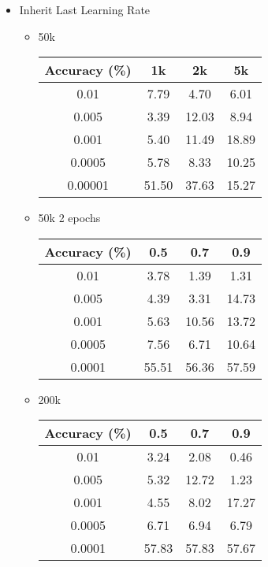 \begin{itemize}
\begin{itemize}
	\end{itemize}
	\item Inherit Last Learning Rate
	\begin{itemize}
		\item 50k 
		\begin{table}[H]
			\centering
			\begin{tabular}{cccc}
				\hline
				Accuracy (\%) & 1k   & 2k   & 5k      \\ \hline
				0.01          & 7.79  & 4.70  & 6.01 \\ \hline
				0.005       & 3.39 & 12.03 & 8.94 \\ \hline
				0.001        & 5.40 & 11.49 & 18.89 \\ \hline
				0.0005          & 5.78  & 8.33  & 10.25 \\ \hline
				0.00001        & 51.50 & 37.63 & 15.27 \\ \hline
			\end{tabular}
		\end{table}	
		\item 50k 2 epochs
\begin{table}[H]
	\centering
	\begin{tabular}{cccc}
		Accuracy (\%) & 0.5   & 0.7   & 0.9   \\ \hline
		0.01          & 3.78  & 1.39  & 1.31  \\ \hline
		0.005         & 4.39  & 3.31  & 14.73 \\ \hline
		0.001         & 5.63  & 10.56 & 13.72 \\ \hline
		0.0005        & 7.56  & 6.71  & 10.64 \\ \hline
		0.0001        & 55.51 & 56.36 & 57.59 \\ \hline
	\end{tabular}
\end{table}	
		\item 200k
\begin{table}[H]
	\centering
	\begin{tabular}{cccc}
		Accuracy (\%) & 0.5   & 0.7   & 0.9   \\ \hline
		0.01          & 3.24  & 2.08  & 0.46  \\ \hline
		0.005         & 5.32  & 12.72 & 1.23  \\ \hline
		0.001         & 4.55  & 8.02  & 17.27 \\ \hline
		0.0005        & 6.71  & 6.94  & 6.79  \\ \hline
		0.0001        & 57.83 & 57.83 & 57.67 \\ \hline
	\end{tabular}
\end{table}			
			
	\end{itemize}
\end{itemize}




